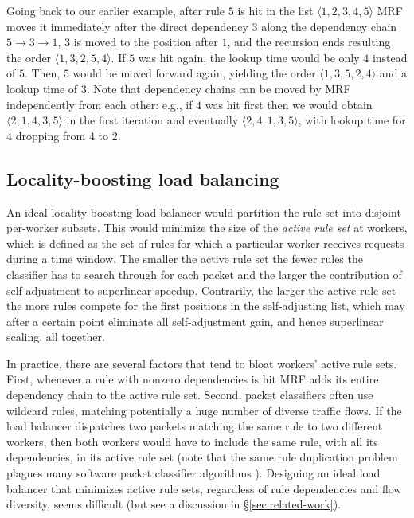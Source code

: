 Going back to our earlier example, after rule $5$ is hit in the list $\langle1, 2, 3, 4, 5\rangle$ MRF moves it immediately after the direct dependency $3$ along the dependency chain $5\to 3\to 1$, $3$ is moved to the position after $1$, and the recursion ends resulting the order $\langle1, 3, 2, 5, 4\rangle$. If $5$ was hit again, the lookup time would be only $4$ instead of $5$. Then, $5$ would be moved forward again, yielding the order $\langle1, 3, 5, 2, 4\rangle$ and a lookup time of $3$. Note that dependency chains can be moved by MRF independently from each other: e.g., if $4$ was hit first then we would obtain $\langle2, 1, 4, 3, 5\rangle$ in the first iteration and eventually $\langle2, 4, 1, 3, 5\rangle$, with lookup time for $4$ dropping from $4$ to $2$.

\subsection{Locality-boosting load balancing}
\label{sec:sa-rss}

An ideal locality-boosting load balancer would partition the rule set into disjoint per-worker subsets. This would minimize the size of the \emph{active rule set} at workers, which is defined as the set of rules for which a particular worker receives requests during a time window. The smaller the active rule set the fewer rules the classifier has to search through for each packet and the larger the contribution of self-adjustment to superlinear speedup. Contrarily, the larger the active rule set the more rules compete for the first positions in the self-adjusting list, which may after a certain point eliminate all self-adjustment gain, and hence superlinear scaling, all together.

In practice, there are several factors that tend to bloat workers' active rule sets. First, whenever a rule with nonzero dependencies is hit MRF adds its entire dependency chain to the active rule set. Second, packet classifiers often use wildcard rules, matching potentially a huge number of diverse traffic flows. If the load balancer dispatches two packets matching the same rule to two different workers, then both workers would have to include the same rule, with all its dependencies, in its active rule set (note that the same rule duplication problem plagues many software packet classifier algorithms \cite{10.1145/863955.863980, 820051, 10.1145/1851182.1851208, 8485947}). Designing an ideal load balancer that minimizes active rule sets, regardless of rule dependencies and flow diversity, seems difficult (but see a discussion in \S\ref{sec:related-work}).

